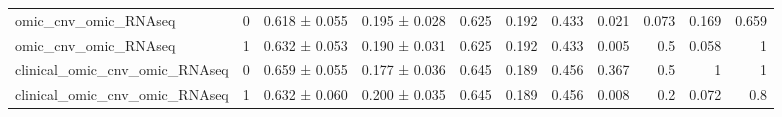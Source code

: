 \begin{tabular}{lrllrrrrrrr}
 omic\_cnv\_omic\_RNAseq                               &      0 & 0.618 ± 0.055 & 0.195 ± 0.028 &    0.625 &     0.192 &     0.433 &     0.021 &      0.073 &        0.169 &         0.659 \\
 omic\_cnv\_omic\_RNAseq                               &      1 & 0.632 ± 0.053 & 0.190 ± 0.031 &    0.625 &     0.192 &     0.433 &     0.005 &      0.5   &        0.058 &         1     \\
 clinical\_omic\_cnv\_omic\_RNAseq                      &      0 & 0.659 ± 0.055 & 0.177 ± 0.036 &    0.645 &     0.189 &     0.456 &     0.367 &      0.5   &        1     &         1     \\
 clinical\_omic\_cnv\_omic\_RNAseq                      &      1 & 0.632 ± 0.060 & 0.200 ± 0.035 &    0.645 &     0.189 &     0.456 &     0.008 &      0.2   &        0.072 &         0.8   \\
\hline
\end{tabular}